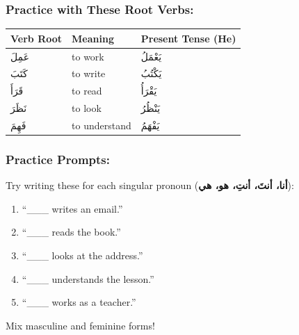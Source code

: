 \documentclass[
  a4paper,
  DIV=11,
  numbers=noendperiod]{scrartcl}
\providecommand{\tightlist}{%
  \setlength{\itemsep}{0pt}\setlength{\parskip}{0pt}}
\begin{document}
\begin{tcolorbox}[enhanced jigsaw, bottomrule=.15mm, arc=.35mm, colbacktitle=quarto-callout-caution-color!10!white, opacityback=0, toptitle=1mm, title=\textcolor{quarto-callout-caution-color}{\faFire}\hspace{0.5em}{Click to Practice with More Root Verbs}, colframe=quarto-callout-caution-color-frame, opacitybacktitle=0.6, colback=white, coltitle=black, titlerule=0mm, left=2mm, toprule=.15mm, bottomtitle=1mm, rightrule=.15mm, leftrule=.75mm, breakable]

\subsubsection{Practice with These Root
Verbs:}\label{practice-with-these-root-verbs}

\begin{longtable}[]{@{}lll@{}}
\toprule\noalign{}
Verb Root & Meaning & Present Tense (He) \\
\midrule\noalign{}
\endhead
\bottomrule\noalign{}
\endlastfoot
عَمِلَ & to work & يَعْمَلُ \\
كَتَبَ & to write & يَكْتُبُ \\
قَرَأَ & to read & يَقْرَأُ \\
نَظَرَ & to look & يَنْظُرُ \\
فَهِمَ & to understand & يَفْهَمُ \\
\end{longtable}

\subsubsection{Practice Prompts:}\label{practice-prompts}

Try writing these for each singular pronoun (\textbf{أنا، أنتَ، أنتِ، هو،
هي}):

\begin{enumerate}
\def\labelenumi{\arabic{enumi}.}
\tightlist
\item
  ``\_\_\_ writes an email.''\\
\item
  ``\_\_\_ reads the book.''\\
\item
  ``\_\_\_ looks at the address.''\\
\item
  ``\_\_\_ understands the lesson.''\\
\item
  ``\_\_\_ works as a teacher.''
\end{enumerate}

Mix masculine and feminine forms!

\end{tcolorbox}
\end{document}

